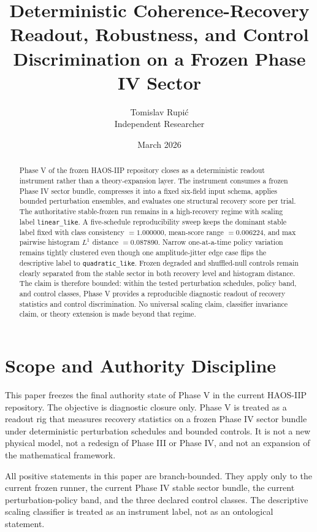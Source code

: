 \documentclass[11pt]{article}
\title{Deterministic Coherence-Recovery Readout, Robustness, and Control Discrimination on a Frozen Phase IV Sector}
\author{Tomislav Rupi\'c \\ Independent Researcher}
\date{March 2026}
\begin{document}
\maketitle

\begin{abstract}
Phase V of the frozen HAOS-IIP repository closes as a deterministic readout instrument rather than a theory-expansion layer. The instrument consumes a frozen Phase IV sector bundle, compresses it into a fixed six-field input schema, applies bounded perturbation ensembles, and evaluates one structural recovery score per trial. The authoritative stable-frozen run remains in a high-recovery regime with scaling label \texttt{linear\_like}. A five-schedule reproducibility sweep keeps the dominant stable label fixed with class consistency $= 1.000000$, mean-score range $= 0.006224$, and max pairwise histogram $L^1$ distance $= 0.087890$. Narrow one-at-a-time policy variation remains tightly clustered even though one amplitude-jitter edge case flips the descriptive label to \texttt{quadratic\_like}. Frozen degraded and shuffled-null controls remain clearly separated from the stable sector in both recovery level and histogram distance. The claim is therefore bounded: within the tested perturbation schedules, policy band, and control classes, Phase V provides a reproducible diagnostic readout of recovery statistics and control discrimination. No universal scaling claim, classifier invariance claim, or theory extension is made beyond that regime.
\end{abstract}

\section{Scope and Authority Discipline}

This paper freezes the final authority state of Phase V in the current HAOS-IIP repository. The objective is diagnostic closure only. Phase V is treated as a readout rig that measures recovery statistics on a frozen Phase IV sector bundle under deterministic perturbation schedules and bounded controls. It is not a new physical model, not a redesign of Phase III or Phase IV, and not an expansion of the mathematical framework.

All positive statements in this paper are branch-bounded. They apply only to the current frozen runner, the current Phase IV stable sector bundle, the current perturbation-policy band, and the three declared control classes. The descriptive scaling classifier is treated as an instrument label, not as an ontological statement.
\end{document}
